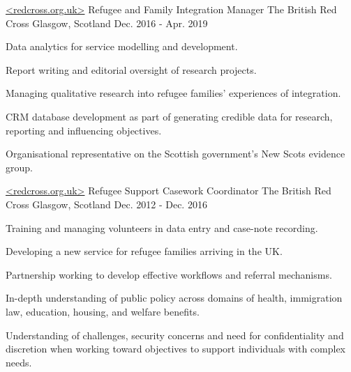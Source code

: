 \begin{cventries}
  \cventry
    {\href{https://www.redcross.org.uk/}{<redcross.org.uk>}\vspace{-5pt} \newline Refugee and Family Integration Manager } %
    {The British Red Cross\vspace{-9pt}} %
    {Glasgow, Scotland} %
    {Dec. 2016 - Apr. 2019} %
    {
      \begin{cvitems} %
        \item {Data analytics for service modelling and development. }
        \item {Report writing and editorial oversight of research projects.}
        \item {Managing qualitative research into refugee families’ experiences of integration.}
        \item {CRM database development as part of generating credible data for research, reporting and influencing objectives. }
        \item{Organisational representative on the Scottish government’s New Scots evidence group. }
      \end{cvitems}
    }

  \cventry
    {\href{https://www.redcross.org.uk/}{<redcross.org.uk>}\vspace{-5pt} \newline Refugee Support Casework Coordinator} %
    {The British Red Cross\vspace{-9pt}} %
    {Glasgow, Scotland} %
    {Dec. 2012 - Dec. 2016} %
    {
      \begin{cvitems} %
        \item {Training and managing volunteers in data entry and case-note recording.}
        \item {Developing a new service for refugee families arriving in the UK. }
        \item {Partnership working to develop effective workflows and referral mechanisms. }
        \item{In-depth understanding of public policy across domains of health, immigration law, education, housing, and welfare benefits.}
        \item{Understanding of challenges, security concerns and need for confidentiality and discretion when  working toward objectives to support individuals with complex needs.}
      \end{cvitems}
    }


\end{cventries}
